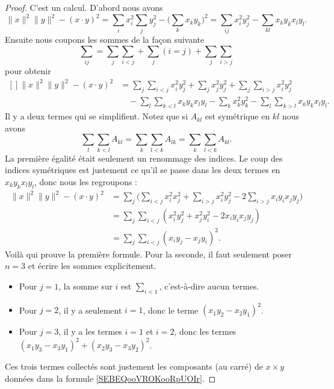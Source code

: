 \begin{proof}
    C'est un calcul. D'abord nous avons
    \begin{equation}
        \| x \|^2\| y \|^2-(x\cdot y)^2=\sum_ix_i^2\sum_jy_j^2-\big( \sum_k x_ky_k  \big)^2=\sum_{ij}x_i^2y_j^2-\sum_{kl}x_ky_kx_ly_l.
    \end{equation}
    Ensuite nous coupons les sommes de la façon suivante
    \begin{equation}
        \sum_{ij}=\sum_j\sum_{i<j}+\sum_j(i=j)+\sum_j\sum_{i>j}
    \end{equation}
    pour obtenir
    \begin{equation}
        \begin{aligned}[]
            \| x \|^2\| y \|^2-(x\cdot y)^2&=\sum_j\sum_{i<j}x_i^2y_j^2+\sum_jx_j^2y_j^2+\sum_j\sum_{i>j}x_i^2y_j^2\\
                &\quad-\sum_l\sum_{k<l}x_ky_kx_ly_l-\sum_kx_k^2y_k^2-\sum_l\sum_{k>l}x_ky_kx_ly_l.
        \end{aligned}
    \end{equation}
    Il y a deux termes qui se simplifient. Notez que si \( A_{kl}\) est symétrique en \( kl\) nous avons
    \begin{equation}
        \sum_l\sum_{k<l}A_{kl}=\sum_k\sum_{l<k}A_{lk}=\sum_k\sum_{l<k}A_{kl}.
    \end{equation}
    La première égalité était seulement un renommage des indices. Le coup des indices symétriques est justement ce qu'il se passe dans les deux termes en\( x_ky_kx_ly_l\), donc nous les regroupons :
    \begin{subequations}
        \begin{align}
            \| x \|^2\| y \|^2-(x\cdot y)^2&=\sum_j\big( \sum_{i<j}x_i^2x_j^2+\sum_{i>j}x_i^2y_j^2-2\sum_{i>j}x_iy_ix_jy_j \big)\\
            &=\sum_j\sum_{i<j}(x_i^2y_j^2+x_j^2y_i^2-2x_iy_ix_jy_j)\\
            &=\sum_j\sum_{i<j}(x_iy_j-x_jy_i)^2.
        \end{align}
    \end{subequations}
    Voilà qui prouve la première formule. Pour la seconde, il faut seulement poser \( n=3\) et écrire les sommes explicitement.

    \begin{itemize}
        \item 
    Pour \( j=1\), la somme sur \( i\) est \( \sum_{i<1}\), c'est-à-dire aucun termes.
\item
    Pour \( j=2\), il y a seulement \( i=1\), donc le terme \( (x_1y_2-x_2y_1)^2\).

\item
    Pour \( j=3\), il y a les termes \( i=1\) et \( i=2\), donc les termes \( (x_1y_3-x_3y_1)^2+(x_2y_3-x_3y_2)^2\).
    \end{itemize}
    Ces trois termes collectés sont justement les composants (au carré) de \( x\times y\) données dans la formule \eqref{SEBEQooVROKooRpUOIr}.
\end{proof}


